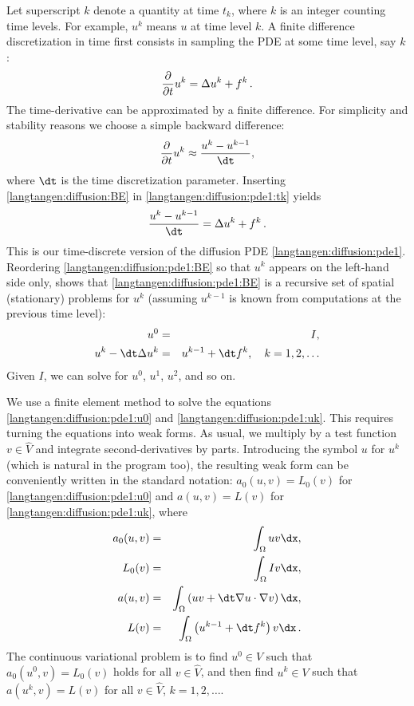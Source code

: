 Let superscript $k$ denote
a quantity at time $t_k$,
where $k$ is an integer counting time levels. For example, $u^k$ means
$u$ at time level $k$.
A finite difference discretization in time first consists in
sampling the PDE at some time level, say $k$:
\begin{equation} {\partial \over\partial t}u^k = \Delta u^k + f^k\thinspace .
\label{langtangen:diffusion:pde1:tk}
\end{equation}
The time-derivative can be approximated by a finite difference.
For simplicity and stability reasons we choose a
simple backward difference:
\begin{equation} {\partial \over\partial t}u^k\approx {u^k - u^{k-1}\over{\dt}},
\label{langtangen:diffusion:BE}
\end{equation}
where ${\dt}$ is the time discretization parameter.
Inserting \eqref{langtangen:diffusion:BE} in \eqref{langtangen:diffusion:pde1:tk}
yields
\begin{equation}
{u^k - u^{k-1}\over{\dt}} = \Delta u^k + f^k\langtangenep
\label{langtangen:diffusion:pde1:BE}
\end{equation}
This is our time-discrete version of the diffusion PDE \eqref{langtangen:diffusion:pde1}.
Reordering \eqref{langtangen:diffusion:pde1:BE} so that $u^k$ appears
on the left-hand side only, shows that \eqref{langtangen:diffusion:pde1:BE}
is a recursive set of
spatial (stationary) problems for $u^k$ (assuming $u^{k-1}$ is known from
computations at the previous time level):
\begin{eqnarray}
u^0 &=& I,\label{langtangen:diffusion:pde1:u0}\\
u^k - {\dt}\Delta u^k &=&  u^{k-1} + {\dt} f^k,\quad k=1,2,\ldots
\label{langtangen:diffusion:pde1:uk}
\end{eqnarray}
Given $I$, we can solve for $u^0$, $u^1$, $u^2$, and so on.

We use a finite element method
to solve the
equations \eqref{langtangen:diffusion:pde1:u0} and \eqref{langtangen:diffusion:pde1:uk}.
This requires turning the equations into weak forms.
As usual, we multiply by a test function $v\in \hat V$ and integrate
second-derivatives by parts. Introducing the symbol $u$ for $u^k$
(which is natural in the program too), the resulting weak
form can be conveniently written in the standard notation:
$a_0(u,v)=L_0(v)$ for \eqref{langtangen:diffusion:pde1:u0}
and $a(u,v)=L(v)$ for \eqref{langtangen:diffusion:pde1:uk}, where
\begin{eqnarray}
a_0(u,v) &=& \int_\Omega uv\dx,\label{langtangen:diffusion:pde1:a0}\\
L_0(v) &=& \int_\Omega Iv\dx,\label{langtangen:diffusion:pde1:L0}\\
a(u,v) &=& \int_\Omega\left( uv + {\dt}
\nabla u\cdot \nabla v\right)\dx,\label{langtangen:diffusion:pde1:a}\\
L(v) &=& \int_\Omega \left(u^{k-1} + {\dt}  f^k\right)v\dx\langtangenep
\label{langtangen:diffusion:pde1:L}
\end{eqnarray}
The continuous variational problem is to find 
$u^0\in V$ such that $a_0(u^0,v)=L_0(v)$ holds for all $v\in\hat V$,
and then find $u^k\in V$
such that $a(u^k,v)=L(v)$ for all $v\in\hat V$,
$k=1,2,\ldots$.

